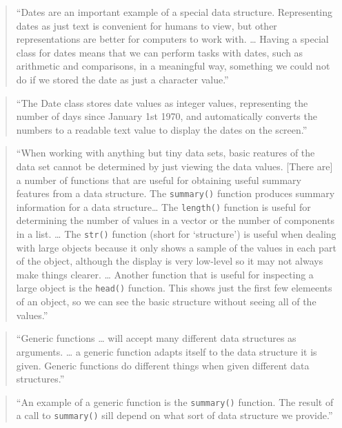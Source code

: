 \documentclass[]{tufte-book}
\begin{document}
\begin{quote}
``Dates are an important example of a special data structure. Representing
dates as just text is convenient for humans to view, but other representations
are better for computers to work with. \ldots{} Having a special class for dates
means that we can perform tasks with dates, such as arithmetic and comparisons,
in a meaningful way, something we could not do if we stored the date as just
a character value.'' \citep{murrell2009introduction}
\end{quote}

\begin{quote}
``The Date class stores date values as integer values, representing the number
of days since January 1st 1970, and automatically converts the numbers to
a readable text value to display the dates on the screen.'' \citep{murrell2009introduction}
\end{quote}

\begin{quote}
``When working with anything but tiny data sets, basic reatures of the data
set cannot be determined by just viewing the data values. {[}There are{]} a number of
functions that are useful for obtaining useful summary features from a data structure.
The \texttt{summary()} function produces summary information for a data structure\ldots{} The
\texttt{length()} function is useful for determining the number of values in a vector or
the number of components in a list. \ldots{} The \texttt{str()} function (short for `structure')
is useful when dealing with large objects because it only shows a sample of the values
in each part of the object, although the display is very low-level so it may not always
make things clearer. \ldots{} Another function that is useful for inspecting a large
object is the \texttt{head()} function. This shows just the first few elemeents of an
object, so we can see the basic structure without seeing all of the values.''
\citep{murrell2009introduction}
\end{quote}

\begin{quote}
``Generic functions \ldots{} will accept many different data structures as
arguments. \ldots{} a generic function adapts itself to the data structure it is
given. Generic functions do different things when given different data structures.''
\citep{murrell2009introduction}
\end{quote}

\begin{quote}
``An example of a generic function is the \texttt{summary()} function. The result of a
call to \texttt{summary()} sill depend on what sort of data structure we provide.''
\citep{murrell2009introduction}
\end{quote}
\end{document}
